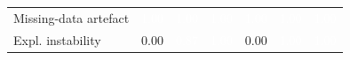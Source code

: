 \begin{table}[t]
\begin{tabular}{l|ccc|ccc}
Missing-data artefact & \cellcolor[RGB]{13,54,107}\textcolor{white}{1.00} & \cellcolor[RGB]{13,54,107}\textcolor{white}{1.00} & \cellcolor[RGB]{13,54,107}\textcolor{white}{1.00} & \cellcolor[RGB]{13,54,107}\textcolor{white}{1.00} & \cellcolor[RGB]{13,54,107}\textcolor{white}{1.00} & \cellcolor[RGB]{13,54,107}\textcolor{white}{1.00} \\
Expl. instability & \cellcolor[RGB]{205,226,251}0.00 & \cellcolor[RGB]{22,74,141}\textcolor{white}{0.87} & \cellcolor[RGB]{13,54,107}\textcolor{white}{1.00} & \cellcolor[RGB]{205,226,251}0.00 & \cellcolor[RGB]{13,54,107}\textcolor{white}{1.00} & \cellcolor[RGB]{13,54,107}\textcolor{white}{1.00} \\
\bottomrule
\end{tabular}
\end{table}
